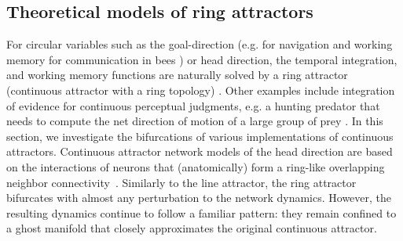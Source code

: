 \documentclass{article} %
\newcounter{ct}
\theoremstyle{definition}
\theoremstyle{remark}
\begin{document}
\subsection{Theoretical models of ring attractors}\label{sec:ras}

For circular variables such as the goal-direction (e.g. for navigation \citep{sun2020decentralised, westeinde2024transforming} and working memory for communication in bees \citep{frisch1993dance}) %
or head direction, the temporal integration, and working memory functions are naturally solved by a ring attractor (continuous attractor with a ring topology) \citep{kim2017ring,kim2019generation,turner2017angular,turner2020neuroanatomical,hulse2020mechanisms,taube2003persistent,taube2007head,angelaki2020head,fisher2022flexible,neupane2024mental}.
Other examples include
integration of evidence for continuous perceptual judgments, e.g. a hunting predator that needs to compute the net direction of motion of a large group of prey \citep{esnaola2022flexible}.
In this section, we investigate the bifurcations of various implementations of continuous attractors.
Continuous attractor network models of the head direction are based on the interactions of neurons that (anatomically) form a ring-like overlapping neighbor connectivity~\citep{zhang1996,noorman2024accurate,ajabi2023,vafidis2022,boucheny2005continuous,knierim2012,song2005angular,xie2002double}.
Similarly to the line attractor, the ring attractor bifurcates with almost any perturbation to the network dynamics. However, the resulting dynamics continue to follow a familiar pattern: they remain confined to a ghost manifold that closely approximates the original continuous attractor.
\end{document}
